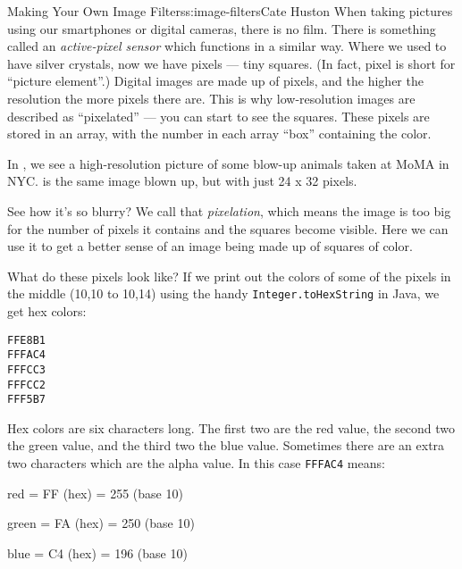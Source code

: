 \begin{aosachapter}{Making Your Own Image Filters}{s:image-filters}{Cate Huston}
When taking pictures using our smartphones or digital cameras, there is
no film. There is something called an \emph{active-pixel sensor} which
functions in a similar way. Where we used to have silver crystals, now
we have pixels --- tiny squares. (In fact, pixel is short for ``picture
element''.) Digital images are made up of pixels, and the higher the
resolution the more pixels there are. This is why low-resolution images
are described as ``pixelated'' --- you can start to see the squares.
These pixels are stored in an array, with the number in each array
``box'' containing the color.

In , we see a high-resolution
picture of some blow-up animals taken at MoMA in NYC.
 is the same image blown up,
but with just 24 x 32 pixels.



See how it's so blurry? We call that \emph{pixelation}, which means the
image is too big for the number of pixels it contains and the squares
become visible. Here we can use it to get a better sense of an image
being made up of squares of color.

What do these pixels look like? If we print out the colors of some of
the pixels in the middle (10,10 to 10,14) using the handy
\texttt{Integer.toHexString} in Java, we get hex colors:

\begin{verbatim}
FFE8B1
FFFAC4
FFFCC3
FFFCC2
FFF5B7
\end{verbatim}

Hex colors are six characters long. The first two are the red value, the
second two the green value, and the third two the blue value. Sometimes
there are an extra two characters which are the alpha value. In this
case \texttt{FFFAC4} means:

\begin{aosaitemize}

\item
  red = FF (hex) = 255 (base 10)
\item
  green = FA (hex) = 250 (base 10)
\item
  blue = C4 (hex) = 196 (base 10)
\end{aosaitemize}


\end{aosachapter}

